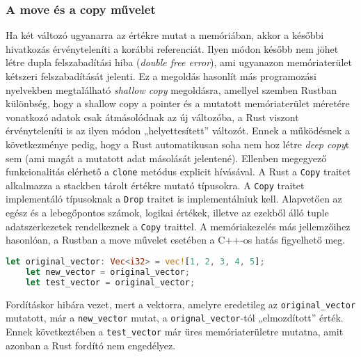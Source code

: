 \subsubsection{A move és a copy művelet}
Ha két változó ugyanarra az értékre mutat a memóriában, akkor a későbbi hivatkozás érvényteleníti a korábbi referenciát. Ilyen módon később nem jöhet létre dupla felszabadítási hiba (\textit{double free error}), ami ugyanazon memóriaterület kétszeri felszabadítását jelenti. Ez a megoldás hasonlít más programozási nyelvekben megtalálható \textit{shallow copy} megoldásra, amellyel szemben Rustban különbség, hogy a shallow copy a pointer és a mutatott memóriaterület méretére vonatkozó adatok csak átmásolódnak az új változóba, a Rust viszont érvényteleníti is az ilyen módon „helyettesített” változót. Ennek a működésnek a következménye pedig, hogy a Rust automatikusan soha nem hoz létre \textit{deep copy}t sem (ami magát a mutatott adat másolását jelentené). Ellenben megegyező funkcionalitás elérhető a \lstinline{clone} metódus explicit hívásával. A Rust a \lstinline{Copy} traitet alkalmazza a stackben tárolt értékre mutató típusokra. A \lstinline{Copy} traitet implementáló típusoknak a \lstinline{Drop} traitet is implementálniuk kell. Alapvetően az egész és a lebegőpontos számok, logikai értékek, illetve az ezekből álló tuple adatszerkezetek rendelkeznek a \lstinline{Copy} traittel. A memóriakezelés más jellemzőihez hasonlóan, a Rustban a move művelet esetében a C++-os hatás figyelhető meg.
\begin{lstlisting}[language=Rust, style=boxed]
    let original_vector: Vec<i32> = vec![1, 2, 3, 4, 5];
    let new_vector = original_vector;
    let test_vector = original_vector;
\end{lstlisting}
Fordításkor hibára vezet, mert a vektorra, amelyre eredetileg az \lstinline{original_vector} mutatott,  már a \lstinline{new_vector} mutat, a \lstinline{orignal_vector}-tól „elmozdított” érték. Ennek következtében a \lstinline{test_vector} már üres memóriaterületre mutatna, amit azonban a Rust fordító nem engedélyez.

